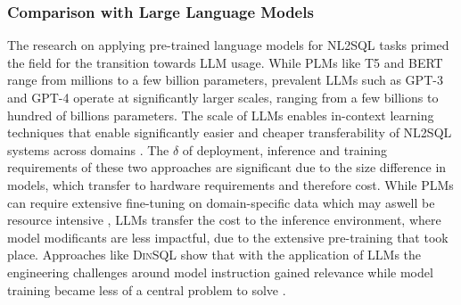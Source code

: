 \subsubsection{Comparison with Large Language Models}

The research on applying pre-trained language models for NL2SQL tasks primed the field for the transition towards LLM usage. While
PLMs like T5 and BERT range from millions to a few billion parameters, prevalent LLMs such as GPT-3 and GPT-4 operate at
significantly larger scales, ranging from a few billions to hundred of billions parameters. The scale of LLMs enables in-context
learning techniques that enable significantly easier and cheaper transferability of NL2SQL systems across domains \citep{DAIL-SQL}.
The $\delta$ of deployment, inference and training requirements of these two approaches are significant due to the size difference
in models, which transfer to hardware requirements and therefore cost. While PLMs can require extensive fine-tuning on
domain-specific data which may aswell be resource intensive \citep{GRAPHIX, RESDSQL, GRAPPA, STRUG}, LLMs transfer the cost to the 
inference environment, where model modificants are less impactful, due to the extensive pre-training that took place. Approaches 
like \textsc{DinSQL} show that with the application of LLMs the engineering challenges around model instruction gained relevance 
while model training became less of a central problem to solve \citep{DINSQL}.
